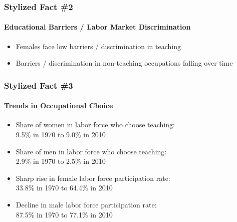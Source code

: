 \documentclass[11pt]{beamer}
\begin{document}
	\begin{frame}
		\frametitle{Stylized Fact \#2}
		\framesubtitle{Educational Barriers / Labor Market Discrimination}
		\begin{itemize}
			\item Females face low barriers / discrimination in teaching
			\item Barriers / discrimination in non-teaching occupations falling over time
		\end{itemize}
	\end{frame}
	
	\begin{frame}
		\frametitle{Stylized Fact \#3}
		\framesubtitle{Trends in Occupational Choice}
		\begin{itemize}
			\item Share of women in labor force who choose teaching: \\9.5\% in 1970 to 9.0\% in 2010
			\item Share of men in labor force who choose teaching: \\2.9\% in 1970 to 2.5\% in 2010
			\item Sharp rise in female labor force participation rate: \\33.8\% in 1970 to 64.4\% in 2010
			\item Decline in male labor force participation rate: \\87.5\% in 1970 to 77.1\% in 2010
		\end{itemize}
	\end{frame}

\end{document}
